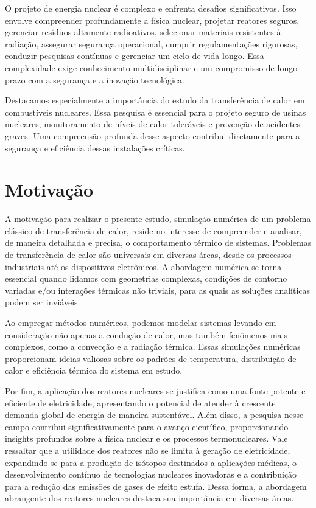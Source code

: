 O projeto de energia nuclear é complexo e enfrenta desafios significativos. Isso envolve compreender profundamente a física nuclear, projetar reatores seguros, gerenciar resíduos altamente radioativos, selecionar materiais resistentes à radiação, assegurar segurança operacional, cumprir regulamentações rigorosas, conduzir pesquisas contínuas e gerenciar um ciclo de vida longo. Essa complexidade exige conhecimento multidisciplinar e um compromisso de longo prazo com a segurança e a inovação tecnológica.

Destacamos especialmente a importância do estudo da transferência de calor em combustíveis nucleares. Essa pesquisa é essencial para o projeto seguro de usinas nucleares, monitoramento de níveis de calor toleráveis e prevenção de acidentes graves. Uma compreensão profunda desse aspecto contribui diretamente para a segurança e eficiência dessas instalações críticas.

\section{Motivação}

A motivação para realizar o presente estudo, simulação numérica de um problema clássico de transferência de calor, reside no interesse de compreender e analisar, de maneira detalhada e precisa, o comportamento térmico de sistemas. Problemas de transferência de calor são universais em diversas áreas, desde os processos industriais até os dispositivos eletrônicos. A abordagem numérica se torna essencial quando lidamos com geometrias complexas, condições de contorno variadas e/ou interações térmicas não triviais, para as quais as soluções analíticas podem ser inviáveis.

Ao empregar métodos numéricos, podemos modelar sistemas levando em consideração não apenas a condução de calor, mas também fenômenos mais complexos, como a convecção e a radiação térmica. Essas simulações numéricas proporcionam ideias valiosas sobre os padrões de temperatura, distribuição de calor e eficiência térmica do sistema em estudo.

Por fim, a aplicação dos reatores nucleares se justifica como uma fonte potente e eficiente de eletricidade, apresentando o potencial de atender à crescente demanda global de energia de maneira sustentável. Além disso, a pesquisa nesse campo contribui significativamente para o avanço científico, proporcionando insights profundos sobre a física nuclear e os processos termonucleares. Vale ressaltar que a utilidade dos reatores não se limita à geração de eletricidade, expandindo-se para a produção de isótopos destinados a aplicações médicas, o desenvolvimento contínuo de tecnologias nucleares inovadoras e a contribuição para a redução das emissões de gases de efeito estufa. Dessa forma, a abordagem abrangente dos reatores nucleares destaca sua importância em diversas áreas.

